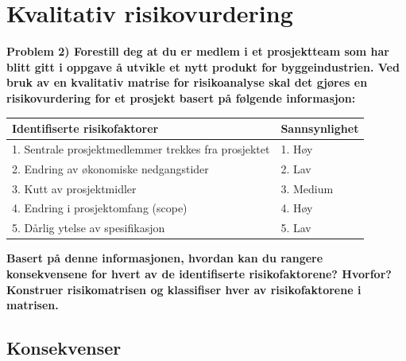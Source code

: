 \section{Kvalitativ risikovurdering}

	{\bf Problem 2) Forestill deg at du er medlem i et prosjektteam som har blitt gitt i oppgave 
	å utvikle et nytt produkt for byggeindustrien. Ved bruk av en kvalitativ matrise for 
	risikoanalyse skal det gjøres en risikovurdering for et prosjekt basert på følgende 
	informasjon: }

	\begin{table}[H]
		\begin{tabular}{ p{9cm} p{3cm} }
			\hline
			Identifiserte risikofaktorer & Sannsynlighet \\ \hline
			1. Sentrale prosjektmedlemmer trekkes fra prosjektet & 1. Høy \\
			2. Endring av økonomiske nedgangstider & 2. Lav \\
			3. Kutt av prosjektmidler & 3. Medium \\
			4. Endring i prosjektomfang (scope) & 4. Høy \\
			5. Dårlig ytelse av spesifikasjon & 5. Lav \\
			\hline

		\end{tabular}
	\end{table}

	{\bf Basert på denne informasjonen, hvordan kan du rangere konsekvensene for hvert av de
	identifiserte risikofaktorene? Hvorfor? Konstruer risikomatrisen og klassifiser hver 
	av risikofaktorene i matrisen.}


	\subsection{Konsekvenser}

